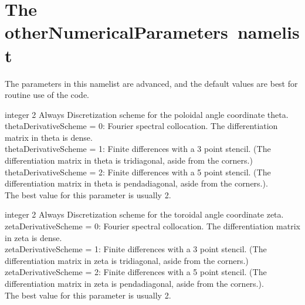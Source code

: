\section{The {\ttfamily otherNumericalParameters}~namelist}
\label{sec:otherNumericalParameters}

The parameters in this namelist are advanced, and the default values are best for routine use of the code.

\myhrule

{integer}
{2}
{Always}
{Discretization scheme for the poloidal angle coordinate theta.\\

{\ttfamily thetaDerivativeScheme} = 0: Fourier spectral collocation.  The differentiation matrix in theta is dense.\\

{\ttfamily thetaDerivativeScheme} = 1: Finite differences with a 3 point stencil.  (The differentiation matrix in theta is tridiagonal, aside from the corners.)\\

{\ttfamily thetaDerivativeScheme} = 2: Finite differences with a 5 point stencil.  (The differentiation matrix in theta is pendadiagonal, aside from the corners.).\\

The best value for this parameter is usually 2.}


\myhrule

{integer}
{2}
{Always}
{Discretization scheme for the toroidal angle coordinate zeta.\\

{\ttfamily zetaDerivativeScheme} = 0: Fourier spectral collocation.  The differentiation matrix in zeta is dense.\\

{\ttfamily zetaDerivativeScheme} = 1: Finite differences with a 3 point stencil.  (The differentiation matrix in zeta is tridiagonal, aside from the corners.)\\

{\ttfamily zetaDerivativeScheme} = 2: Finite differences with a 5 point stencil.  (The differentiation matrix in zeta is pendadiagonal, aside from the corners.).\\

The best value for this parameter is usually 2.}

\myhrule

